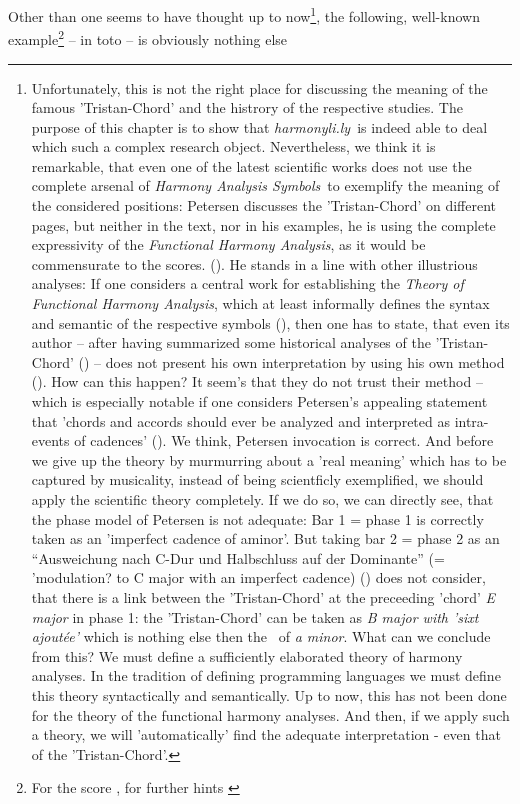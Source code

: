\documentclass[
  DIV=calc,
  BCOR=5mm,
  12pt,
  headings=small,
  oneside,
  abstract=true,
  toc=bib,
  xcolor=dvipsnames,
  openany,
  english]{scrartcl}
\newcommand{\acc}[0]{\textit}
\newcommand{\hlyn}[0]{\textit{harmonyli.ly}}
\newcommand{\has}[1]{\textit{Harmony Analysis Symbol#1}}
\begin{document}
Other than one seems to have thought up to now\footnote{Unfortunately, this is
not the right place for discussing the meaning of the famous 'Tristan-Chord' and
the histrory of the respective studies. The purpose of this chapter is to show
that \hlyn\ is indeed able to deal which such a complex research object.
Nevertheless, we think it is remarkable, that even one of the latest scientific
works does not use the complete arsenal of \has{s}\ to exemplify the meaning of
the considered positions: Petersen discusses the 'Tristan-Chord' on different
pages, but neither in the text, nor in his examples, he is using the complete
expressivity of the \acc{Functional Harmony Analysis}, as it
would be commensurate to the scores. (\cite[cf.][48f, 50f, 56ff,
59]{Petersen2019a}). He stands in a line with other illustrious analyses: If one
considers a central work for establishing the \acc{Theory of Functional Harmony
Analysis}, which at least informally defines the syntax and semantic of the
respective symbols (\cite[cf.][282]{Delamotte2011a}), then one has to state,
that even its author -- after having summarized some historical analyses of the
'Tristan-Chord' (\cite[cf.][225-227]{Delamotte2011a}) -- does not present his
own interpretation by using his own method (\cite[cf.][227f]{Delamotte2011a}).
How can this happen? It seem's that they do not trust their method -- which is
especially notable if one considers Petersen's appealing statement that 'chords
and accords should ever be analyzed and interpreted as intra-events of
cadences' (\cite[cf.][51]{Petersen2019a}).
We think, Petersen invocation is correct. And before we give up the theory by
murmurring about a 'real meaning' which has to be captured by musicality,
instead of being scientficly exemplified, we should apply the scientific theory
completely. If we do so, we can directly see, that the phase model of Petersen
is not adequate:
Bar 1 = phase 1 is correctly taken as an 'imperfect cadence of aminor'. But
taking bar 2 = phase 2 as an \enquote{Ausweichung nach C-Dur und Halbschluss auf
der Dominante} (=
'modulation? to C major with an imperfect cadence)
(\cite[cf.][51]{Petersen2019a}) does not consider, that there is a link between
the 'Tristan-Chord' at the preceeding 'chord' \acc{E major} in phase 1: the
'Tristan-Chord' can be taken as \acc{B major with 'sixt ajoutée'} which is
nothing else then the \DD{}\ of \acc{a minor}.
What can we conclude from this? We must define a sufficiently elaborated theory
of harmony analyses. In the tradition of defining programming languages we must
define this theory syntactically and semantically. Up to now, this has not been
done for the theory of the functional harmony analyses. And then, if we apply
such a theory, we will 'automatically' find the adequate interpretation - even
that of the 'Tristan-Chord'.}, the following, well-known example\footnote{For
the score \cite[cf.][\nopage]{wpTristan2019b}, for further hints
\cite[cf.][\nopage]{wpTristan2019a}} -- in toto -- is obviously nothing else
\end{document}
